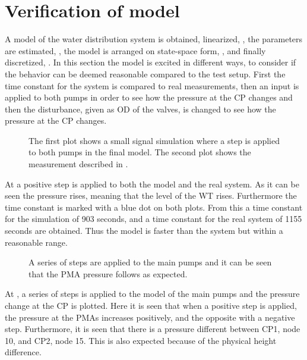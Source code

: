 \section{Verification of model}
\label{verification_of_model}

A model of the water distribution system is obtained, linearized, , the parameters are estimated, , the model is arranged on state-space form, , and finally discretized, . In this section the model is excited in different ways, to consider if the behavior can be deemed reasonable compared to the test setup. First the time constant for the system is compared to real measurements, then an input is applied to both pumps in order to see how the pressure at the CP changes and then the disturbance, given as OD of the valves, is changed to see how the pressure at the CP changes. 

\begin{figure}[H]
   \centering
    
    \caption{The first plot shows a small signal simulation where a step is applied to both pumps in the final model. The second plot shows the measurement described in .}
    \label{simulation_time_constant}
\end{figure}

At  a positive step is applied to both the model and the real system. As it can be seen the pressure rises, meaning that the level of the WT rises. Furthermore the time constant is marked with a blue dot on both plots. From this a time constant for the simulation of 903 seconds, and a time constant for the real system of 1155 seconds are obtained. Thus the model is faster than the system but within a reasonable range.

\begin{figure}[H]
   \centering
    
    \caption{A series of steps are applied to the main pumps and it can be seen that the PMA pressure follows as expected.}
    \label{input_simulation}
\end{figure}

At , a series of steps is applied to the model of the main pumps and the pressure change at the CP is plotted. Here it is seen that when a positive step is applied, the pressure at the PMAs increases positively, and the opposite with a negative step. Furthermore, it is seen that there is a pressure different between CP1, node 10, and CP2, node 15. This is also expected because of the physical height difference.  

